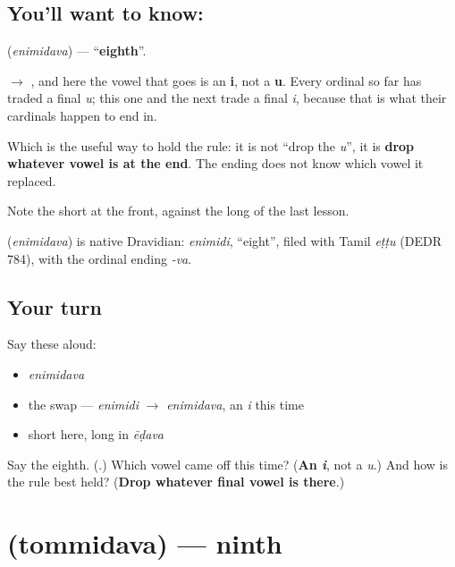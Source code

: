 \subsection*{You'll want to know: }
\textbf{} (\emph{enimidava}) — \textquotedblleft{}\textbf{eighth}\textquotedblright{}.

\textbf{} $\to$ \textbf{}, and here the vowel that goes is an \textbf{i}, not a \textbf{u}. Every ordinal so far has traded a final \emph{u}; this one and the next trade a final \emph{i}, because that is what their cardinals happen to end in.

Which is the useful way to hold the rule: it is not \textquotedblleft{}drop the \emph{u}\textquotedblright{}, it is \textbf{drop whatever vowel is at the end}. The ending does not know which vowel it replaced.

Note the short \textbf{} at the front, against the long \textbf{} of the last lesson.

\begin{cousinweb}
\textbf{} (\emph{enimidava}) is native Dravidian: \emph{enimidi}, \textquotedblleft{}eight\textquotedblright{}, filed with Tamil \emph{eṭṭu} (DEDR 784), with the ordinal ending \emph{-va}.
\end{cousinweb}

\subsection*{Your turn}
Say these aloud:

\begin{itemize}
\raggedright
  \item \emph{enimidava}
  \item the swap — \emph{enimidi} $\to$ \emph{enimidava}, an \emph{i} this time
  \item short \emph{} here, long \emph{} in \emph{ēḍava}
\end{itemize}

\begin{tcolorbox}[breakable,colback=teal!4,colframe=teal!35!black,title={Before you move on}]
Say the eighth. (\textbf{}.) Which vowel came off this time? (\textbf{An \emph{i}}, not a \emph{u}.) And how is the rule best held? (\textbf{Drop whatever final vowel is there}.)
\end{tcolorbox}
\section[\texorpdfstring{\te{తొమ్మిదవ} (tommidava)}{తొమ్మిదవ (tommidava)}]{ (tommidava) — ninth}

